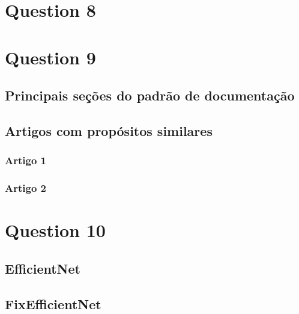 \documentclass[a4paper]{article}    %
\begin{document}
\newpage
\section*{Question 8}



\newpage
\setcounter{section}{9}
\setcounter{subsection}{0}
\section*{Question 9}

\subsection{Principais seções do padrão de documentação}

\subsection{Artigos com propósitos similares}

\subsubsection*{Artigo 1}

\subsubsection*{Artigo 2}

\newpage
\setcounter{section}{10}
\setcounter{subsection}{0}
\section*{Question 10}

\subsection{EfficientNet}

\subsection{FixEfficientNet}

\end{document}
